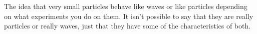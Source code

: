 The idea that very small particles behave like waves
or like particles depending on what experiments you 
do on them. It isn't possible to say that they are
really particles or really waves, just that they have
some of the characteristics of both.